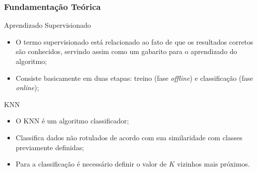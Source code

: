 \documentclass[xcolor={dvipsnames,svgnames,table}]{beamer}
\begin{document}
	\begin{frame}
		\frametitle{Fundamentação Teórica}
		\begin{block}{Aprendizado Supervisionado}
			\begin{itemize}[label=\textcolor{black}{\textbullet}, left=5pt]
				\justifying
				\item O termo supervisionado está relacionado ao fato de que os resultados corretos são conhecidos, servindo assim como um gabarito para o aprendizado do algoritmo;
				\item Consiste basicamente em duas etapas: treino (fase \textit{offline}) e classificação (fase \textit{online});
			\end{itemize}
		\end{block}		
		\begin{block}{KNN}
			\begin{itemize}[label=\textcolor{black}{\textbullet}, left=5pt]
				\justifying
				\item O KNN é um algoritmo classificador; 
				\item Classifica dados não rotulados de acordo com sua similaridade com classes previamente definidas;
				\item Para a classificação é necessário definir o valor de $K$ vizinhos mais próximos.
			\end{itemize}
		\end{block}	
	\end{frame}

	
\end{document}

